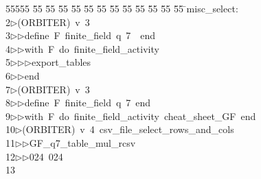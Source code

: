 %
%
\begin{tabbing}
55555 \= 55 \= 55 \= 55 \= 55 \= 55 \= 55 \= 55 \= 55 \= 55 \= 55 \= 55 \= 55 \= \>misc\_select:\\[0pt]
2\>$\triangleright$\>(ORBITER)\ v\ 3\ \\[0pt]
3\>$\triangleright$\>$\triangleright$\>define\ F\ finite\_field\ q\ 7\ \ end\ \\[0pt]
4\>$\triangleright$\>$\triangleright$\>with\ F\ do\ finite\_field\_activity\ \\[0pt]
5\>$\triangleright$\>$\triangleright$\>$\triangleright$\>export\_tables\ \\[0pt]
6\>$\triangleright$\>$\triangleright$\>end\\[0pt]
7\>$\triangleright$\>(ORBITER)\ v\ 3\ \\[0pt]
8\>$\triangleright$\>$\triangleright$\>define\ F\ finite\_field\ q\ 7\ end\ \\[0pt]
9\>$\triangleright$\>$\triangleright$\>with\ F\ do\ finite\_field\_activity\ cheat\_sheet\_GF\ end\\[0pt]
10\>$\triangleright$\>(ORBITER)\ v\ 4\ csv\_file\_select\_rows\_and\_cols\ \\[0pt]
11\>$\triangleright$\>$\triangleright$\>GF\_q7\_table\_mul\_rcsv\ \\[0pt]
12\>$\triangleright$\>$\triangleright$\>024\ 024\ \\[0pt]
13\>\end{tabbing}
